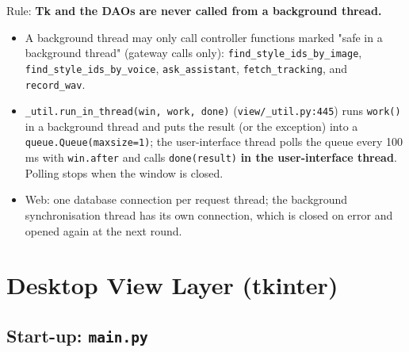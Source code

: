 Rule: \textbf{Tk and the DAOs are never called from a background
thread.}

\begin{itemize}
\tightlist
\item
  A background thread may only call controller functions marked "safe in
  a background thread" (gateway calls only):
  \texttt{find\_\allowbreak{}style\_\allowbreak{}ids\_\allowbreak{}by\_\allowbreak{}image},
  \texttt{find\_\allowbreak{}style\_\allowbreak{}ids\_\allowbreak{}by\_\allowbreak{}voice}, \texttt{ask\_\allowbreak{}assistant},
  \texttt{fetch\_\allowbreak{}tracking}, and \texttt{record\_\allowbreak{}wav}.
\item
  \texttt{\_\allowbreak{}util.\allowbreak{}run\_\allowbreak{}in\_\allowbreak{}thread(\allowbreak{}win,\allowbreak{} work,\allowbreak{} done)}
  (\texttt{view/\allowbreak{}\_\allowbreak{}util.\allowbreak{}py:445}) runs \texttt{work(\allowbreak{})} in a background
  thread and puts the result (or the exception) into a
  \texttt{queue.\allowbreak{}Queue(\allowbreak{}maxsize=\allowbreak{}1)}; the user-interface thread polls the
  queue every 100 ms with \texttt{win.\allowbreak{}after} and calls
  \texttt{done(\allowbreak{}result)} \textbf{in the user-interface thread}. Polling
  stops when the window is closed.
\item
  Web: one database connection per request thread; the background
  synchronisation thread has its own connection, which is closed on
  error and opened again at the next round.
\end{itemize}

\hypertarget{desktop-view-layer-tkinter}{%
\section{Desktop View Layer
(tkinter)}\label{desktop-view-layer-tkinter}}

\hypertarget{start-up-main.py}{%
\subsection{\texorpdfstring{Start-up:
\texttt{main.\allowbreak{}py}}{Start-up: main.py}}\label{start-up-main.py}}

